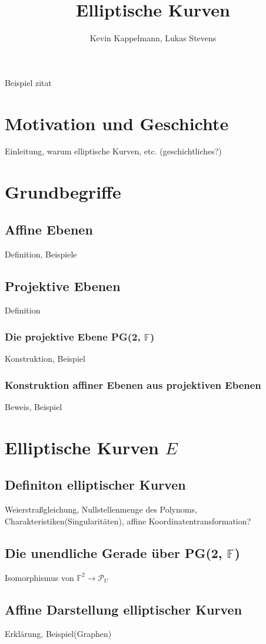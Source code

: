 \documentclass[hidelinks]{article}
\title{Elliptische Kurven}
\author{Kevin Kappelmann, Lukas Stevens}
\begin{document}
\maketitle
\newpage
\tableofcontents
\newpage

Beispiel zitat
\cite[chapter, p.~215]{blablubb}
\section{Motivation und Geschichte}
Einleitung, warum elliptische Kurven, etc. (geschichtliches?)
\section{Grundbegriffe}
\subsection{Affine Ebenen}
Definition, Beispiele
\subsection{Projektive Ebenen}
Definition
\subsubsection{Die projektive Ebene PG(2, $\mathbb{F}$)}
Konstruktion, Beispiel
\subsubsection{Konstruktion affiner Ebenen aus projektiven Ebenen}
Beweis, Beispiel
\section{Elliptische Kurven $E$}
\subsection{Definiton elliptischer Kurven}
Weierstraßgleichung, Nullstellenmenge des Polynoms, Charakteristiken(Singularitäten), affine Koordinatentransformation?
\subsection{Die unendliche Gerade über PG(2, $\mathbb{F}$)}
Isomorphismus von $\mathbb{F}^2 \rightarrow \mathcal{P}_U$
\subsection{Affine Darstellung elliptischer Kurven}
Erklärung, Beispiel(Graphen)
\end{document}

